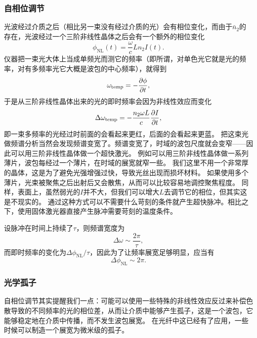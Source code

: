 \subsubsection{自相位调节}

光波经过介质之后（相比另一束没有经过介质的光）会有相位变化，而由于$\bar{n}_2$的存在，光波经过一个三阶非线性晶体之后会有一个额外的相位变化
\begin{equation}
    \phi_\text{NL}(t) = \frac{\omega}{c} L n_2 I(t).
    \label{eq:self-phase-adjustement}
\end{equation}
仪器把一束光大体上当成单频光而测它的频率（即所谓，对单色光它就是光的频率，对有多频率光它大概是波包的中心频率），就得到
\[
    \omega_\text{temp} = - \pdv{\phi}{t},
\]
于是从三阶非线性晶体出来的光的即时频率会因为非线性效应而变化
\begin{equation}
    \Delta \omega_\text{temp} = - \frac{n_2 \omega L}{c} \pdv{I}{t},
    \label{eq:temp-phase-change}
\end{equation}
即一束多频率的光经过时前面的会看起来更红，后面的会看起来更蓝。
把这束光做频谱分析当然会发现频谱变宽了。频谱变宽了，时域的波包尺度就会变窄——因此可以用三阶非线性晶体做一个超快激光。
例如可以用三阶非线性晶体做一系列薄片，波包每经过一个薄片，在时域的展宽就窄一些。
我们这里不用一个非常厚的晶体，这是为了避免光强增强过快，导致光丝出现而损坏材料。
如果使用多个薄片，光束被聚焦之后出射后又会散焦，从而可以比较容易地调控聚焦程度。
同样，表面上，虽然弱光的$I$并不大，但我们可以增大$L$去调节它的相位，但其实这是不现实的。
通过这种方式可以不需要什么苛刻的条件就产生超快脉冲。相比之下，使用固体激光器直接产生脉冲需要苛刻的温度条件。

设脉冲在时间上持续了$\tau$，则频谱宽度为
\[
    \Delta \omega \sim \frac{2\pi}{\tau},
\]
而即时频率的变化为$\Delta \phi_\text{NL} / \tau$，因此为了让频率展宽足够明显，应当有
\begin{equation}
    \Delta \phi_\text{NL} \sim 2\pi.
\end{equation}

\subsubsection{光学孤子}

自相位调节其实提醒我们一点：可能可以使用一些特殊的非线性效应反过来补偿色散导致的不同频率的光的相位差，从而让介质中能够产生孤子，这是一个波包，它能够稳定地在介质中传播，而不发生波包展宽。
在光纤中这已经有了应用，一些时候可以制造一个展宽为微米级的孤子。

